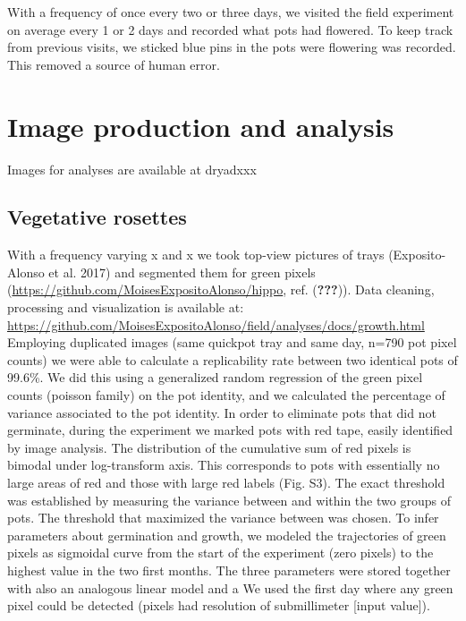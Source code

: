 \documentclass[]{article}
\begin{document}
With a frequency of once every two or three days, we visited the field
experiment on average every 1 or 2 days and recorded what pots had
flowered. To keep track from previous visits, we sticked blue pins in
the pots were flowering was recorded. This removed a source of human
error.

\section{Image production and
analysis}\label{image-production-and-analysis}

Images for analyses are available at dryadxxx

\subsection{Vegetative rosettes}\label{vegetative-rosettes}

With a frequency varying x and x we took top-view pictures of trays
(Exposito-Alonso et al. 2017) and segmented them for green pixels
(\url{https://github.com/MoisesExpositoAlonso/hippo}, ref.
({\textbf{???}})). Data cleaning, processing and visualization is
available at:
\url{https://github.com/MoisesExpositoAlonso/field/analyses/docs/growth.html}
Employing duplicated images (same quickpot tray and same day, n=790 pot
pixel counts) we were able to calculate a replicability rate between two
identical pots of 99.6\%. We did this using a generalized random
regression of the green pixel counts (poisson family) on the pot
identity, and we calculated the percentage of variance associated to the
pot identity. In order to eliminate pots that did not germinate, during
the experiment we marked pots with red tape, easily identified by image
analysis. The distribution of the cumulative sum of red pixels is
bimodal under log-transform axis. This corresponds to pots with
essentially no large areas of red and those with large red labels (Fig.
S3). The exact threshold was established by measuring the variance
between and within the two groups of pots. The threshold that maximized
the variance between was chosen. To infer parameters about germination
and growth, we modeled the trajectories of green pixels as sigmoidal
curve from the start of the experiment (zero pixels) to the highest
value in the two first months. The three parameters were stored together
with also an analogous linear model and a We used the first day where
any green pixel could be detected (pixels had resolution of
submillimeter {[}input value{]}).
\end{document}
